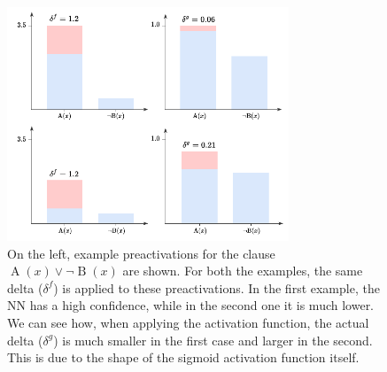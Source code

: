 \begin{figure}[h!]
	\centering
	\includegraphics[width=0.75\textwidth]{figures/preac_deltas_example.pdf}
	\caption{On the left, example preactivations for the clause $\operatorname{A}(x) \vee \neg \operatorname{B}(x)$ are shown. For both the examples, the same delta ($\delta^f$) is applied to these preactivations. In the first example, the NN has a high confidence, while in the second one it is much lower. We can see how, when applying the activation function, the actual delta ($\delta^g$) is much smaller in the first case and larger in the second. This is due to the shape of the sigmoid activation function itself.  }
	\label{fig:preacs_deltas_example}
\end{figure}

